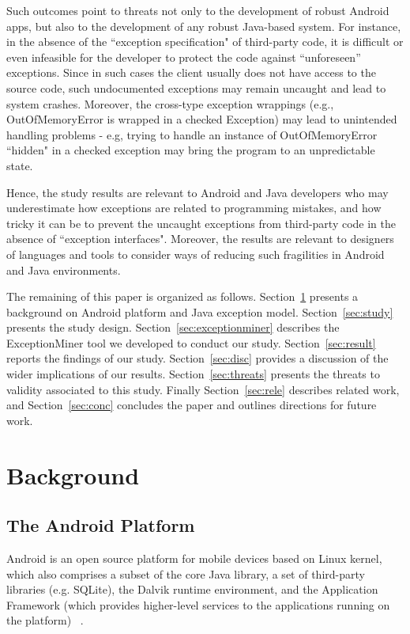 \documentclass[conference]{IEEEtran}
\begin{document}
Such outcomes point to threats not only to the development of robust Android apps, 
but also to the development of any robust Java-based system. For instance, in the absence of the 
``exception specification" of third-party code, it is difficult or 
even infeasible for the developer to protect the code against ``unforeseen'' exceptions. 
Since in such cases the client usually does not have access to the source code, such undocumented exceptions may 
remain uncaught and lead to system crashes. Moreover, the cross-type exception wrappings 
(e.g., OutOfMemoryError is wrapped in a checked Exception) 
may lead to unintended handling problems - e.g, trying to handle an instance of OutOfMemoryError ``hidden" in 
a checked exception may bring the program to an unpredictable state.

Hence, the study results are relevant to Android and 
Java developers who may underestimate how 
 exceptions are related to programming mistakes, and how 
 tricky it can be to prevent the uncaught exceptions from third-party code
 in the absence of ``exception interfaces". Moreover, the results are relevant to 
designers of languages and tools to consider ways of reducing such fragilities 
in Android and Java environments.

The remaining of this paper is organized as follows. 
Section~\ref{sec:back} presents a
background on Android platform and Java exception model. 
Section~\ref{sec:study} presents the study design. 
Section~\ref{sec:exceptionminer} describes the ExceptionMiner tool we developed to conduct our study.
Section~\ref{sec:result} reports the findings of our study.
Section~\ref{sec:disc} provides a discussion of the wider implications of our results.
Section~\ref{sec:threats} presents the threats to validity associated to this study. 
Finally Section~\ref{sec:rele} describes related work, 
and Section~\ref{sec:conc} concludes the paper and outlines
directions for future work.

\section{Background}
\label{sec:back}

\subsection{The Android Platform} \label{sec:extypes}
Android is an open source platform for mobile devices based on Linux kernel,
which also comprises a subset of the core Java library, a set of third-party libraries (e.g.  SQLite),
the Dalvik runtime environment, and the Application Framework (which provides 
higher-level services to the applications running on the platform) ~\cite{andguide}.
\end{document}
